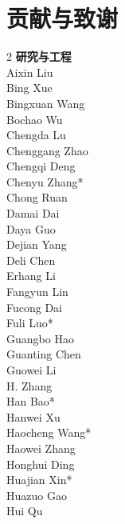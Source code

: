 \documentclass[11pt, a4paper, logo, copyright, nonumbering]{deepseek}
\begin{document}
\section{贡献与致谢}


\begin{multicols}{2} %
\noindent
\textbf{\color{damaiblue} 研究与工程} \\
\color{damaiblue} Aixin Liu \\
\color{damaiblue} Bing Xue \\
\color{damaiblue} Bingxuan Wang \\
\color{damaiblue} Bochao Wu \\
\color{damaiblue} Chengda Lu \\
\color{damaiblue} Chenggang Zhao \\
\color{damaiblue} Chengqi Deng \\
\color{damaiblue} Chenyu Zhang* \\
\color{damaiblue} Chong Ruan \\
\color{damaiblue} Damai Dai \\
\color{damaiblue} Daya Guo \\
\color{damaiblue} Dejian Yang \\
\color{damaiblue} Deli Chen \\
\color{damaiblue} Erhang Li \\
\color{damaiblue} Fangyun Lin \\
\color{damaiblue} Fucong Dai \\
\color{damaiblue} Fuli Luo* \\
\color{damaiblue} Guangbo Hao \\
\color{damaiblue} Guanting Chen \\
\color{damaiblue} Guowei Li \\
\color{damaiblue} H. Zhang \\
\color{damaiblue} Han Bao* \\
\color{damaiblue} Hanwei Xu \\
\color{damaiblue} Haocheng Wang* \\
\color{damaiblue} Haowei Zhang \\
\color{damaiblue} Honghui Ding \\
\color{damaiblue} Huajian Xin* \\
\color{damaiblue} Huazuo Gao \\
\color{damaiblue} Hui Qu \\

\end{multicols}
\end{document}
